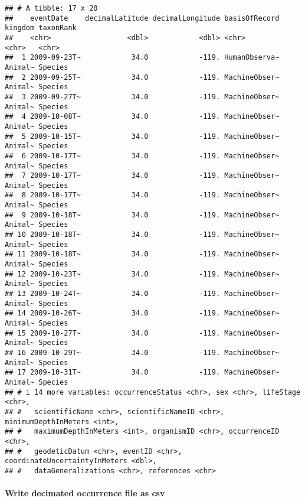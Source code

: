 \documentclass[
]{book}
\begin{document}
\begin{verbatim}
## # A tibble: 17 x 20
##    eventDate    decimalLatitude decimalLongitude basisOfRecord kingdom taxonRank
##    <chr>                  <dbl>            <dbl> <chr>         <chr>   <chr>    
##  1 2009-09-23T~            34.0            -119. HumanObserva~ Animal~ Species  
##  2 2009-09-25T~            34.0            -119. MachineObser~ Animal~ Species  
##  3 2009-09-27T~            34.0            -119. MachineObser~ Animal~ Species  
##  4 2009-10-08T~            34.0            -119. MachineObser~ Animal~ Species  
##  5 2009-10-15T~            34.0            -119. MachineObser~ Animal~ Species  
##  6 2009-10-17T~            34.0            -119. MachineObser~ Animal~ Species  
##  7 2009-10-17T~            34.0            -119. MachineObser~ Animal~ Species  
##  8 2009-10-17T~            34.0            -119. MachineObser~ Animal~ Species  
##  9 2009-10-18T~            34.0            -119. MachineObser~ Animal~ Species  
## 10 2009-10-18T~            34.0            -119. MachineObser~ Animal~ Species  
## 11 2009-10-18T~            34.0            -119. MachineObser~ Animal~ Species  
## 12 2009-10-23T~            34.0            -119. MachineObser~ Animal~ Species  
## 13 2009-10-24T~            34.0            -119. MachineObser~ Animal~ Species  
## 14 2009-10-26T~            34.0            -119. MachineObser~ Animal~ Species  
## 15 2009-10-27T~            34.0            -119. MachineObser~ Animal~ Species  
## 16 2009-10-29T~            34.0            -119. MachineObser~ Animal~ Species  
## 17 2009-10-31T~            34.0            -119. MachineObser~ Animal~ Species  
## # i 14 more variables: occurrenceStatus <chr>, sex <chr>, lifeStage <chr>,
## #   scientificName <chr>, scientificNameID <chr>, minimumDepthInMeters <int>,
## #   maximumDepthInMeters <int>, organismID <chr>, occurrenceID <chr>,
## #   geodeticDatum <chr>, eventID <chr>, coordinateUncertaintyInMeters <dbl>,
## #   dataGeneralizations <chr>, references <chr>
\end{verbatim}

\hypertarget{write-decimated-occurrence-file-as-csv}{%
\paragraph{Write decimated occurrence file as csv}\label{write-decimated-occurrence-file-as-csv}}
\end{document}
